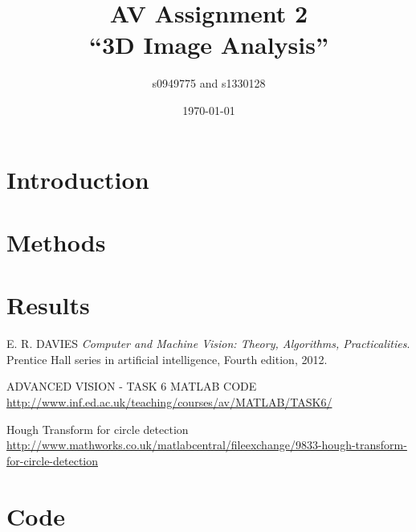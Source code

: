 \documentclass{article}
\begin{document}
\title{AV Assignment 2\\``3D Image Analysis''}
\author{s0949775 and s1330128}
\date{\today}
\maketitle


\section{Introduction}

\section{Methods}

\section{Results}
\begin{thebibliography}{9}
  
  E. R. DAVIES
  \emph{Computer and Machine Vision: Theory, Algorithms, Practicalities}.
  Prentice Hall series in artificial intelligence,
  Fourth edition,
  2012.
  
  ADVANCED VISION - TASK 6 MATLAB CODE
  \url{http://www.inf.ed.ac.uk/teaching/courses/av/MATLAB/TASK6/}
  
  Hough Transform for circle detection
  \url{http://www.mathworks.co.uk/matlabcentral/fileexchange/9833-hough-transform-for-circle-detection}  
  
\end{thebibliography}

\appendix


\newpage

\newpage
\section{Code}
\label{apen:code_in}

%
\end{document}
